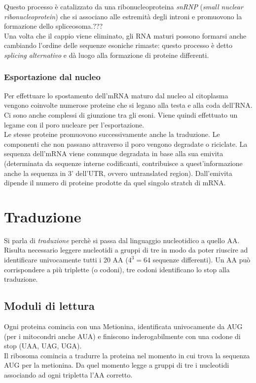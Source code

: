             Questo processo è catalizzato da una ribonucleoproteina \textit{snRNP} (\textit{small nuclear ribonucleoprotein}) che si associano alle estremità degli introni e promuovono la formazione dello spliceosoma.???\\
            Una volta che il cappio viene eliminato, gli RNA maturi possono formarsi anche cambiando l'ordine delle sequenze esoniche rimaste: questo processo è detto \textit{splicing alternativo} e dà luogo alla formazione di proteine differenti.
            
        \subsubsection{Esportazione dal nucleo}
            Per effettuare lo spostamento dell'mRNA maturo dal nucleo al citoplasma vengono coinvolte numerose proteine che si legano alla testa e alla coda dell'RNA. Ci sono anche complessi di giunzione tra gli esoni. Viene quindi effettuato un legame con il poro nucleare per l'esportazione. \\
            Le stesse proteine promuovono successivamente anche la traduzione. Le componenti che non passano attraverso il poro vengono degradate o riciclate. La sequenza dell'mRNA viene comunque degradata in base alla sua emivita (determinata da sequenze interne codificanti, contribuisce a quest'informazione anche la sequenza in 3' dell'UTR, ovvero untranslated region). Dall'emivita dipende il numero di proteine prodotte da quel singolo stratch di mRNA. 

\section{Traduzione}
    Si parla di \textit{traduzione} perchè si passa dal linguaggio nucleotidico a quello AA. Risulta necessario leggere nucleotidi a gruppi di tre in modo da poter riuscire ad identificare univocamente tutti i 20 AA ($4^{3} = 64$ sequenze differenti). Un AA può corrispondere a più triplette (o codoni), tre codoni identificano lo stop alla traduzione.
    \subsection{Moduli di lettura}
        Ogni proteina comincia con una Metionina, identificata univocamente da AUG (per i mitocondri anche AUA) e finiscono inderogabilmente con una codone di stop (UAA, UAG, UGA).\\
        Il ribosoma comincia a tradurre la proteina nel momento in cui trova la sequenza AUG per la metionina. Da quel momento legge a gruppi di tre i nucleotidi associando ad ogni tripletta l'AA corretto.
